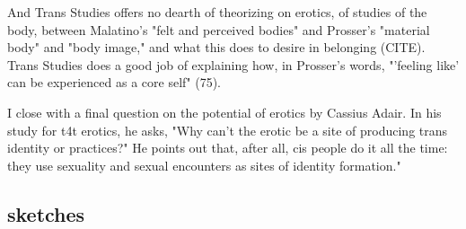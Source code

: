 \documentclass[11pt]{article}
\begin{document}
And Trans Studies offers no dearth of theorizing on erotics, of
studies of the body, between Malatino's "felt and perceived bodies"
and Prosser's "material body" and "body image," and what this does to
desire in belonging (CITE). Trans Studies does a good job of
explaining how, in Prosser's words, "'feeling like' can be experienced
as a core self" (75).

I close with a final question on the potential of erotics by Cassius
Adair. In his study for t4t erotics, he asks, "Why can't the erotic be
a site of producing trans identity or practices?" He points out that,
after all, cis people do it all the time: they use sexuality and
sexual encounters as sites of identity formation."

\subsection{sketches}
\label{sec:org6819980}
\end{document}
